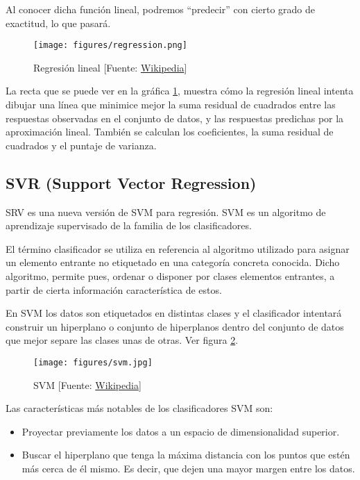 	Al conocer dicha función lineal, podremos ``predecir'' con cierto grado de exactitud, lo que pasará.

	\begin{figure}[htb]
		\begin{center}
			\texttt{[image: figures/regression.png]}
			\caption{Regresión lineal [Fuente: \href{www.wikipedia.org}{Wikipedia}] \label{regression}}
		\end{center}
	\end{figure}
	
	La recta que se puede ver en la gráfica \ref{regression}, muestra cómo la regresión lineal intenta dibujar una línea que minimice mejor la suma residual de cuadrados entre las respuestas observadas en el conjunto de datos, y las respuestas predichas por la aproximación lineal.
	También se calculan los coeficientes, la suma residual de cuadrados y el puntaje de varianza.

	\subsection{SVR (Support Vector Regression)}
	\label{makereference5.3.2}

	SRV es una nueva versión de SVM para regresión. SVM es un algoritmo de aprendizaje supervisado de la familia de los clasificadores.

	El término clasificador se utiliza en referencia al algoritmo utilizado para asignar un elemento entrante no etiquetado en una categoría concreta conocida. Dicho algoritmo, permite pues, ordenar o disponer por clases elementos entrantes, a partir de cierta información característica de estos.

	En SVM los datos son etiquetados en distintas clases y el clasificador intentará construir un hiperplano o conjunto de hiperplanos dentro del conjunto de datos que mejor separe las clases unas de otras. Ver figura \ref{svm}.

	\begin{figure}[htb]
		\begin{center}
			\texttt{[image: figures/svm.jpg]}
			\caption{SVM [Fuente: \href{www.wikipedia.org}{Wikipedia}] \label{svm}}
		\end{center}
	\end{figure}

	Las características más notables de los clasificadores SVM son:
	\begin{itemize}
		\item Proyectar previamente los datos a un espacio de dimensionalidad superior.
		\item Buscar el hiperplano que tenga la máxima distancia con los puntos que estén más cerca de él mismo. Es decir, que dejen una mayor margen entre los datos.
	\end{itemize}

